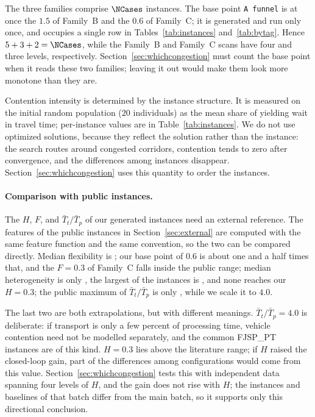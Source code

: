 The three families comprise $\NCases$ instances. The base point \texttt{A funnel} is at once the $1.5$ of Family~B and the $0.6$ of Family~C; it is generated and run only once, and occupies a single row in Tables~\ref{tab:instances} and~\ref{tab:bytag}.
Hence $5+3+2=\NCases$, while the Family~B and Family~C scans have four and three levels, respectively. Section~\ref{sec:whichcongestion} must count the base point when it reads these two families; leaving it out would make them look more monotone than they are.

Contention intensity is determined by the instance structure. It is measured on the initial random population ($20$ individuals) as the mean share of yielding wait in travel time; per-instance values are in Table~\ref{tab:instances}.
We do not use optimized solutions, because they reflect the solution rather than the instance: the search routes around congested corridors, contention tends to zero after convergence, and the differences among instances disappear.
Section~\ref{sec:whichcongestion} uses this quantity to order the instances.

\paragraph{Comparison with public instances.}
The $H$, $F$, and $\bar{T}_t/\bar{T}_p$ of our generated instances need an external reference.
The features of the \PubNInst{} public instances in Section~\ref{sec:external} are computed with the same feature function and the same convention, so the two can be compared directly.
Median flexibility is \PubFMed{}; our base point of $0.6$ is about one and a half times that, and the $F=0.3$ of Family~C falls inside the public range;
median heterogeneity is only \PubHMed{}, the largest of the \PubNInst{} instances is \PubHMax{}, and none reaches our $H=0.3$;
the public maximum of $\bar{T}_t/\bar{T}_p$ is only \PubTtTpHi{}, while we scale it to $4.0$.

The last two are both extrapolations, but with different meanings.
$\bar{T}_t/\bar{T}_p=4.0$ is deliberate: if transport is only a few percent of processing time, vehicle contention need not be modelled separately, and the common FJSP\_PT instances are of this kind.
$H=0.3$ lies above the literature range; if $H$ raised the closed-loop gain, part of the differences among configurations would come from this value.
Section~\ref{sec:whichcongestion} tests this with independent data spanning four levels of $H$, and the gain does not rise with $H$; the instances and baselines of that batch differ from the main batch, so it supports only this directional conclusion.

